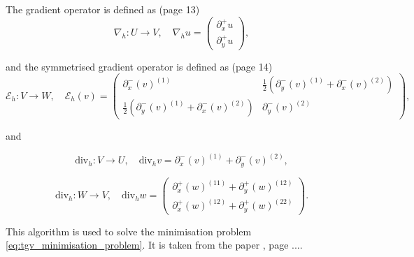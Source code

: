 \documentclass{article}
\begin{document}
The gradient operator is defined as (page 13)
\begin{equation}
    \nabla_h : U \rightarrow V, \quad \nabla_h u = 
    \begin{pmatrix}
    \partial_x^+ u \\
    \partial_y^+ u
    \end{pmatrix},
\end{equation}

and the symmetrised gradient operator is defined as (page 14)
\begin{equation}
    \mathcal{E}_h : V \rightarrow W, \quad \mathcal{E}_h (v) = 
    \begin{pmatrix}
    \partial_x^- (v)^{(1)} &
    \frac{1}{2} \left( \partial_y^- (v)^{(1)} + \partial_x^- (v)^{(2)} \right) \\
    \frac{1}{2} \left( \partial_y^- (v)^{(1)} + \partial_x^- (v)^{(2)} \right) &
    \partial_y^- (v)^{(2)}
    \end{pmatrix},
\end{equation}

and


\begin{equation}
\mathrm{div}_h : V \rightarrow U, \quad \mathrm{div}_h v = \partial_x^- (v)^{(1)} + \partial_y^- (v)^{(2)},
\end{equation}

\begin{equation}
\mathrm{div}_h : W \rightarrow V, \quad \mathrm{div}_h w = 
\begin{pmatrix}
\partial_x^+ (w)^{(11)} + \partial_y^+ (w)^{(12)} \\
\partial_x^+ (w)^{(12)} + \partial_y^+ (w)^{(22)}
\end{pmatrix}.
\end{equation}


This algorithm is used to solve the minimisation problem \ref{eq:tgv_minimisation_problem}.
It is taken from the paper \cite{recovering_piecewise_smooth_multichannel_images}, page ....



\printbibliography
\end{document}
